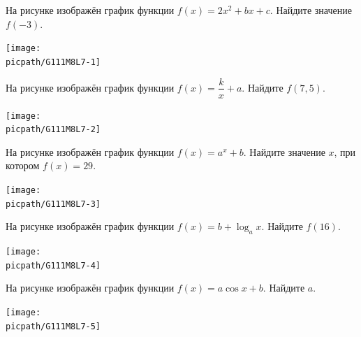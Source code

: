 \begin{class}[number=7]
	\begin{listofex}
		\item
		\begin{minipage}[t]{\bodywidth}
			На рисунке изображён график функции \(f(x)=2x^2+bx+c\). Найдите значение \(f(-3)\).
		\end{minipage}
		\begin{minipage}[t]{\picwidth}
			\texttt{[image: \\picpath/G111M8L7-1]}
		\end{minipage}
		\item
		\begin{minipage}[t]{0.6\linewidth}
			На рисунке изображён график функции \(f(x)=\dfrac{k}{x} +a\). Найдите \(f(7,5)\).
		\end{minipage}
		\begin{minipage}[t]{0.35\linewidth}
			\texttt{[image: \\picpath/G111M8L7-2]}
		\end{minipage}
		\item
		\begin{minipage}[t]{0.6\linewidth}
			На рисунке изображён график функции \(f(x)=a^x+b\). Найдите значение \(x\), при котором \(f(x)=29\).
		\end{minipage}
		\begin{minipage}[t]{0.35\linewidth}
			\texttt{[image: \\picpath/G111M8L7-3]}
		\end{minipage}
		\item
		\begin{minipage}[t]{0.6\linewidth}
			На рисунке изображён график функции \(f(x)=b+\log_{a} x\). Найдите \(f(16)\).
		\end{minipage}
		\begin{minipage}[t]{0.35\linewidth}
			\texttt{[image: \\picpath/G111M8L7-4]}
		\end{minipage}
		\item
		\begin{minipage}[t]{0.56\linewidth}
			На рисунке изображён график функции \(f(x)=a\cos x + b\). Найдите \(a\).
		\end{minipage}
		\begin{minipage}[t]{0.4\linewidth}
			\texttt{[image: \\picpath/G111M8L7-5]}
		\end{minipage}

\end{listofex}
\end{class}
